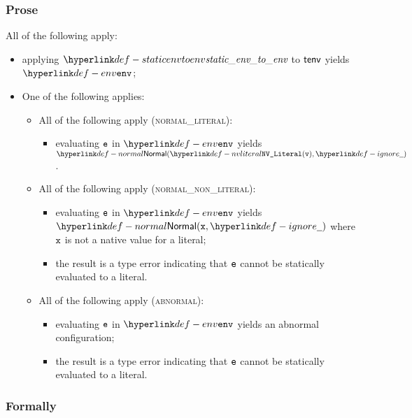 \subsubsection{Prose}
All of the following apply:
\begin{itemize}
  \item applying $\staticenvtoenv$ to $\tenv$ yields $\env$;
  \item One of the following applies:
  \begin{itemize}
    \item All of the following apply (\textsc{normal\_literal}):
    \begin{itemize}
      \item evaluating $\ve$ in $\env$ yields $\Normal(\nvliteral{\vv}, \Ignore)$.
    \end{itemize}

    \item All of the following apply (\textsc{normal\_non\_literal}):
    \begin{itemize}
      \item evaluating $\ve$ in $\env$ yields $\Normal(\vx, \Ignore)$
            where $\vx$ is not a native value for a literal;
      \item the result is a type error indicating that $\ve$ cannot be statically evaluated to a literal.
    \end{itemize}

    \item All of the following apply (\textsc{abnormal}):
    \begin{itemize}
      \item evaluating $\ve$ in $\env$ yields an abnormal configuration;
      \item the result is a type error indicating that $\ve$ cannot be statically evaluated to a literal.
    \end{itemize}
  \end{itemize}
\end{itemize}

\subsubsection{Formally}
\begin{mathpar}
\end{mathpar}

